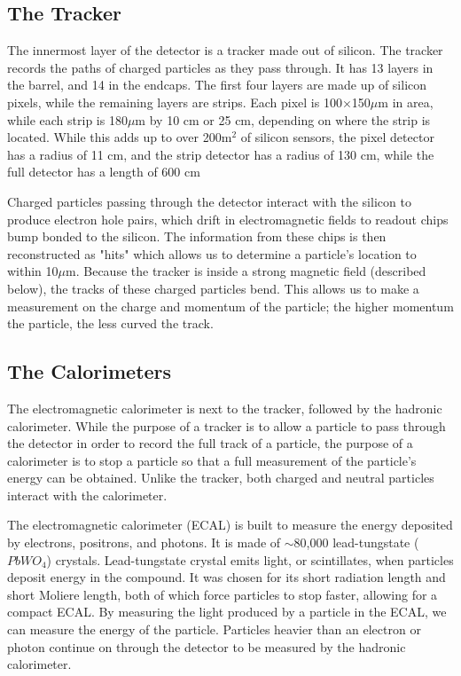 \subsection{The Tracker}

The innermost layer of the detector is a tracker made out of silicon. The tracker records the paths of charged particles as they pass through. It has 13 layers in the barrel, and 14 in the endcaps. The first four layers are made up of silicon pixels, while the remaining layers are strips. Each pixel is 100$\times$150$\mu$m in area, while each strip is 180$\mu$m by 10 cm or 25 cm, depending on where the strip is located. While this adds up to over 200$\text{m}^{2}$ of silicon sensors, the pixel detector has a radius of 11 cm, and the strip detector has a radius of 130 cm, while the full detector has a length of 600 cm

Charged particles passing through the detector interact with the silicon to produce electron hole pairs, which drift in electromagnetic fields to readout chips bump bonded to the silicon. The information from these chips is then reconstructed as "hits" which allows us to determine a particle's location to within 10$\mu$m. Because the tracker is inside a strong magnetic field (described below), the tracks of these charged particles bend. This allows us to make a measurement on the charge and momentum of the particle; the higher momentum the particle, the less curved the track.
\vspace{5mm}

\subsection{The Calorimeters}

The electromagnetic calorimeter is next to the tracker, followed by the hadronic calorimeter. While the purpose of a tracker is to allow a particle to pass through the detector in order to record the full track of a particle, the purpose of a calorimeter is to stop a particle so that a full measurement of the particle's energy can be obtained. Unlike the tracker, both charged and neutral particles interact with the calorimeter.

The electromagnetic calorimeter (ECAL) is built to measure the energy deposited by electrons, positrons, and photons. It is made of $\sim$80,000 lead-tungstate ($PbWO_4$) crystals. Lead-tungstate crystal emits light, or scintillates, when particles deposit energy in the compound. It was chosen for its short radiation length and short Moliere length, both of which force particles to stop faster, allowing for a compact ECAL. By measuring the light produced by a particle in the ECAL, we can measure the energy of the particle. Particles heavier than an electron or photon continue on through the detector to be measured by the hadronic calorimeter.

